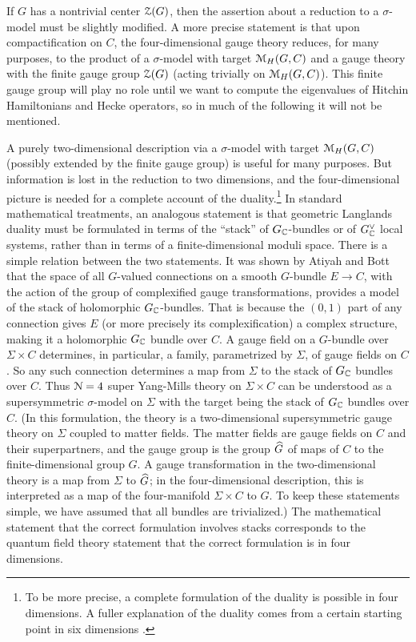 \documentclass[11pt,a4paper]{article}
\begin{document}
If $G$ has a  nontrivial center ${\mathcal Z}(G)$, then the assertion about a reduction to a $\sigma$-model must be slightly modified.   A more precise statement is that upon
compactification on $C$, the
four-dimensional gauge theory reduces, for many purposes, to the product of a $\sigma$-model with target ${\mathcal M}_H(G,C)$ and a gauge theory with the finite
gauge group ${\mathcal Z}(G)$ (acting trivially on ${\mathcal M}_H(G,C)$).   This finite gauge group will play no role until we want to compute the eigenvalues of Hitchin Hamiltonians
and Hecke operators, so in much of the following it will not be mentioned.

A purely two-dimensional description via a $\sigma$-model with target ${\mathcal M}_H(G,C)$ (possibly extended by the finite gauge group) is useful for many purposes. But information is lost in the reduction to
two dimensions, and the four-dimensional picture is needed for a complete account of the duality.\footnote{To be more precise, a complete formulation of the duality
is possible in four dimensions.  A fuller explanation of the duality  comes from a certain starting point in six 
dimensions \cite{WittenLecture}.}
In standard mathematical treatments, an analogous statement is that geometric Langlands duality must be  formulated
in terms of the ``stack'' of $G_{\mathbb C}$-bundles or of $G_{\mathbb C}^\vee$ local systems, rather than in terms of a finite-dimensional moduli space.  
There is a simple relation between the two statements.
It was shown by Atiyah and Bott \cite{AB} that the space of all $G$-valued connections on a smooth $G$-bundle  $E\to C$, with the action
of the group of  complexified gauge transformations, provides a model of the stack of holomorphic $G_{\mathbb C}$-bundles.  
That is because the $(0,1)$ part of any connection gives $E$ (or more precisely its complexification) a complex structure, making it a holomorphic
$G_{\mathbb C}$ bundle over $C$.
A gauge field on a 
$G$-bundle   over $ \Sigma\times C$ 
determines, in particular, a family, parametrized by $\Sigma$, of gauge fields on $C$.    So any such connection  determines a  map from $\Sigma$ to the stack of
$G_{\mathbb C}$ bundles over $C$.   Thus ${\mathcal N}=4$ super Yang-Mills theory on $\Sigma\times C$ can be understood as a supersymmetric $\sigma$-model on $\Sigma$
with the target being the stack of $G_{\mathbb C}$ bundles over $C$.  (In this formulation, the theory is a two-dimensional supersymmetric
gauge theory on $\Sigma$ coupled to matter fields.
 The matter 
fields are gauge fields on $C$ and their superpartners, and the gauge group is the group $\widehat G$ of maps of $C$ to the finite-dimensional group $G$. A  gauge transformation in the two-dimensional theory is a map from $\Sigma$ to $\widehat G$; in the four-dimensional description, this is interpreted
 as a map of the four-manifold $\Sigma\times C$ to $G$.
To keep these statements simple, we have assumed that all bundles are trivialized.)
 The mathematical statement that the correct formulation involves stacks corresponds to the
quantum field theory statement that the correct formulation is in four dimensions.
\end{document}
